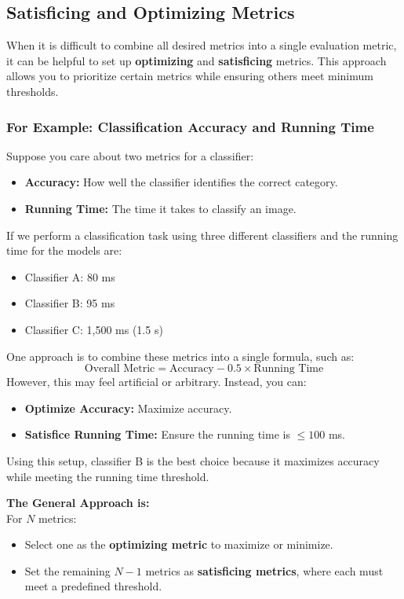 \documentclass[letterpaper,12pt,notitlepage,twoside]{report}
\begin{document}
\subsection{Satisficing and Optimizing Metrics}
When it is difficult to combine all desired metrics into a single evaluation metric, it can be helpful to set up \textbf{optimizing} and \textbf{satisficing} metrics. This approach allows you to prioritize certain metrics while ensuring others meet minimum thresholds.

\subsubsection{For Example: Classification Accuracy and Running Time}
Suppose you care about two metrics for a classifier:
\begin{itemize}[noitemsep, topsep=0pt]
    \item \textbf{Accuracy:} How well the classifier identifies the correct category.
    \item \textbf{Running Time:} The time it takes to classify an image.
\end{itemize}

If we perform a classification task using three different classifiers and the running time for the models are:
\begin{itemize}[noitemsep, topsep=0pt]
    \item Classifier A: 80 ms
    \item Classifier B: 95 ms
    \item Classifier C: 1,500 ms (1.5 s)
\end{itemize}

One approach is to combine these metrics into a single formula, such as:
\[
\text{Overall Metric} = \text{Accuracy} - 0.5 \times \text{Running Time}
\]
However, this may feel artificial or arbitrary. Instead, you can:
\begin{itemize}[noitemsep, topsep=0pt]
    \item \textbf{Optimize Accuracy:} Maximize accuracy.
    \item \textbf{Satisfice Running Time:} Ensure the running time is $\leq 100$ ms.
\end{itemize}

Using this setup, classifier B is the best choice because it maximizes accuracy while meeting the running time threshold.

\textbf{The General Approach is:} \\
For \(N\) metrics:
\begin{itemize}[noitemsep, topsep=0pt]
    \item Select one as the \textbf{optimizing metric} to maximize or minimize.
    \item Set the remaining \(N-1\) metrics as \textbf{satisficing metrics}, where each must meet a predefined threshold.
\end{itemize}
\end{document}

